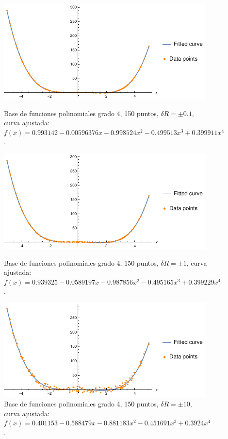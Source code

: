 \documentclass[11pt,letterpaper]{article}
\begin{document}
\begin{figure}
\centering
\includegraphics[width=11cm]{poly_07}
\caption{Base de funciones polinomiales grado 4, 150 puntos, $\delta R=\pm 0.1$,
curva ajustada: $f(x)=0.993142 - 0.00596376 x - 0.998524 x^2 - 0.499513 x^3 + 0.399911 x^4$.}
\includegraphics[width=11cm]{poly_08}
\caption{Base de funciones polinomiales grado 4, 150 puntos, $\delta R=\pm 1$,
curva ajustada: $f(x)=0.939325 - 0.0589197 x - 0.987856 x^2 - 0.495165 x^3 + 0.399229 x^4$.}
\includegraphics[width=11cm]{poly_09}
\caption{Base de funciones polinomiales grado 4, 150 puntos, $\delta R=\pm 10$,
curva ajustada: $f(x)=0.401153 - 0.588479 x - 0.881183 x^2 - 0.451691 x^3 + 0.3924 x^4$.}
\label{fig:poly_50pts}
\end{figure}
\end{document}
